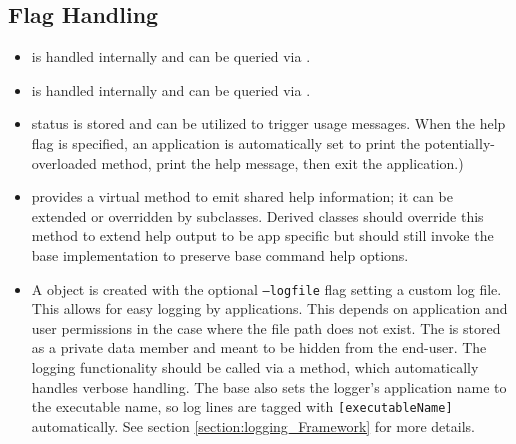 \subsection{Flag Handling}
\begin{itemize}\itemsep0em
	\item {} is handled internally and can be queried via .
	\item {} is handled internally and can be queried via .
	\item {} status is stored and can be utilized to trigger usage messages. When the help flag is specified, an application is automatically set to print the potentially-overloaded  method, print the help message, then exit the application.)
	\item {} provides a virtual method to emit shared help information; it can be extended or overridden by subclasses. Derived classes should override this method to extend help output to be app specific but should still invoke the base implementation to preserve base command help options.
	\item A  object is created with the optional \texttt{--logfile} flag setting a custom log file. This allows for easy logging by applications. This depends on application and user permissions in the case where the file path does not exist. The  is stored as a private data member and meant to be hidden from the end-user. The logging functionality should be called via a  method, which automatically handles verbose handling. The base  also sets the logger's application name to the executable name, so log lines are tagged with \texttt{[executableName]} automatically. See section \ref{section:logging_Framework} for more details.
\end{itemize}

